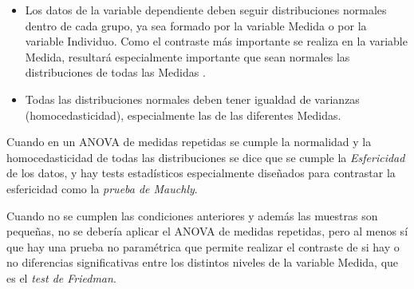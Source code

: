 \begin{itemize}
\item Los datos de la variable dependiente deben seguir distribuciones normales dentro de cada grupo, ya sea formado por la variable Medida
o por la variable Individuo. Como el contraste más importante se realiza en la variable Medida, resultará especialmente importante que sean
normales las distribuciones de todas las Medidas .

\item Todas las distribuciones normales deben tener igualdad de varianzas (homocedasticidad), especialmente las de las diferentes Medidas.
\end{itemize}

Cuando en un ANOVA de medidas repetidas se cumple la normalidad y la homocedasticidad de todas las distribuciones se dice que se cumple la
\emph{Esfericidad} de los datos, y hay tests estadísticos especialmente diseñados para contrastar la esfericidad como la \emph{prueba de
Mauchly}.

Cuando no se cumplen las condiciones anteriores y además las muestras son pequeñas, no se debería aplicar el ANOVA de medidas repetidas,
pero al menos sí que hay una prueba no paramétrica que permite realizar el contraste de si hay o no diferencias significativas entre los
distintos niveles de la variable Medida, que es el \emph{test de Friedman}.


